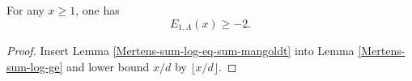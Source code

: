 \begin{corollary}
\label{Mertens-first-error-mangoldt-ge}
\leanok
For any $x \geq 1$, one has
$$ E_{1,\Lambda}(x) \geq - 2.$$
\end{corollary}
\begin{proof}
\leanok
Insert Lemma \ref{Mertens-sum-log-eq-sum-mangoldt} into Lemma \ref{Mertens-sum-log-ge} and lower bound $x/d$ by $\lfloor x/d \rfloor$.
\end{proof}
